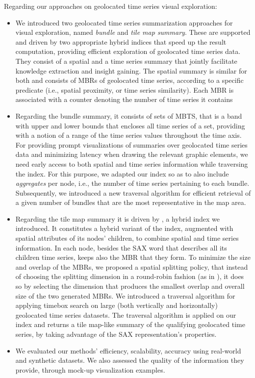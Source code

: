 Regarding our approaches on geolocated time series visual exploration:
\begin{itemize}
	\item We introduced two geolocated time series summarization approaches for visual exploration, named \textit{bundle} and \textit{tile map summary}. These are supported and driven by two appropriate hybrid indices that speed up the result computation, providing efficient exploration of geolocated time series data. They consist of a spatial and a time series summary that jointly facilitate knowledge extraction and insight gaining. The spatial summary is similar for both and consists of MBRs of geolocated time series, according to a specific predicate (i.e., spatial proximity, or time series similarity). Each MBR is associated with a counter denoting the number of time series it contains
	\item Regarding the bundle summary, it consists of sets of MBTS, that is a band with upper and lower bounds that encloses all time series of a set, providing with a notion of a range of the time series values throughout the time axis. For providing prompt visualizations of summaries over geolocated time series data and minimizing latency when drawing the relevant graphic elements, we need early access to both spatial and time series information while traversing the index. For this purpose, we adapted our \btsr index so as to also include {\em aggregates} per node, i.e., the number of time series pertaining to each bundle. Subsequently, we introduced a new traversal algorithm for efficient retrieval of a given number of bundles that are the most representative in the map area. 
	\item Regarding the tile map summary it is driven by \hisax, a hybrid index we introduced. It constitutes a hybrid variant of the \isax index, augmented with spatial attributes of its nodes' children, to combine spatial and time series information. In each node, besides the SAX word that describes all its children time series, \hisax keeps also the MBR that they form. To minimize the size and overlap of the MBRs, we proposed a spatial splitting policy, that instead of choosing the splitting dimension in a round-robin fashion (as in \isax), it does so by selecting the dimension that produces the smallest overlap and overall size of the two generated MBRs. We introduced a traversal algorithm for applying timebox search on large (both vertically and horizontally) geolocated time series datasets. The traversal algorithm is applied on our \hisax index and returns a tile map-like summary of the qualifying geolocated time series, by taking advantage of the SAX representation's properties.
	\item We evaluated our methods' efficiency, scalability, accuracy using real-world and synthetic datasets. We also assessed the quality of the information they provide, through mock-up visualization examples.
\end{itemize}


